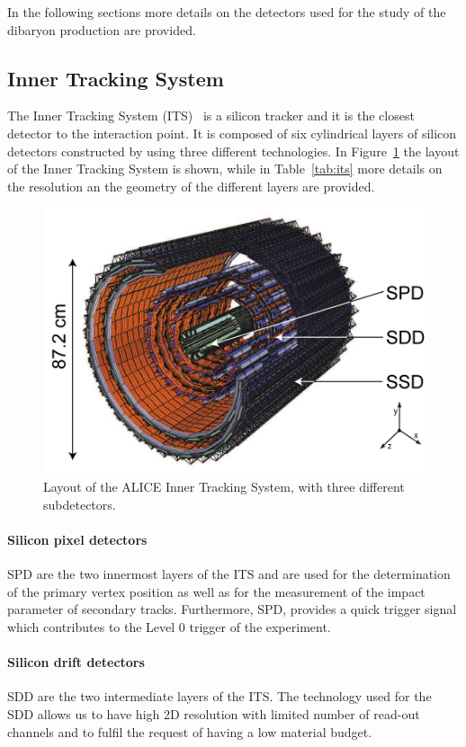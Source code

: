 In the following sections more details on the detectors used for the study of the \dst dibaryon
production are provided.

%
\subsection{Inner Tracking System} \label{sec:its}

The Inner Tracking System (ITS)~\cite{alicemulti,alice:Perf2014} is a silicon tracker and it is
the closest detector to the interaction point.
It is composed of six cylindrical layers of silicon detectors constructed by using three different
technologies.
In Figure~\ref{fig:its} the layout of the Inner Tracking System is shown, while in
Table~\ref{tab:its} more details on the resolution an the geometry of the different layers are
provided.

\begin{figure}
    \centering
    \includegraphics[width=0.7 \textwidth]{gfx/its}
	\caption{Layout of the ALICE Inner Tracking System, with three different subdetectors.}
	\label{fig:its}
\end{figure}

\paragraph{Silicon pixel detectors} 
SPD are the two innermost layers of the ITS and are
used for the determination of the primary vertex position as well as for the measurement of
the impact parameter of secondary tracks.
Furthermore, SPD, provides a quick trigger signal which contributes to the Level 0 trigger of 
the experiment.

\paragraph{Silicon drift detectors} 
SDD are the two intermediate layers of the ITS. The technology used for the SDD 
allows us to have high 2D resolution with limited number of read-out channels and to fulfil the
request of having a low material budget.

